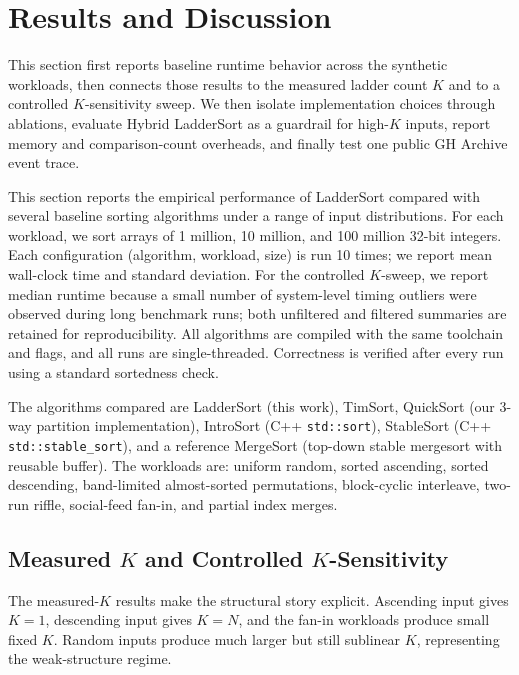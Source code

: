 \documentclass[10pt]{article}
\begin{document}
\section{\texorpdfstring{\textbf{Results and Discussion}}{Results and Discussion}}\label{results-and-discussion}

This section first reports baseline runtime behavior across the synthetic
workloads, then connects those results to the measured ladder count \(K\) and
to a controlled \(K\)-sensitivity sweep. We then isolate implementation choices
through ablations, evaluate Hybrid LadderSort as a guardrail for high-\(K\)
inputs, report memory and comparison-count overheads, and finally test one
public GH Archive event trace.

This section reports the empirical performance of LadderSort compared
with several baseline sorting algorithms under a range of input
distributions. For each workload, we sort arrays of 1 million, 10
million, and 100 million 32-bit integers. Each configuration (algorithm,
workload, size) is run 10 times; we report mean wall-clock time and
standard deviation. For the controlled \(K\)-sweep, we report median runtime because a small number of system-level timing outliers were observed during long benchmark runs; both unfiltered and filtered summaries are retained for reproducibility. All algorithms are compiled with the same toolchain
and flags, and all runs are single-threaded. Correctness is verified
after every run using a standard sortedness check.

The algorithms compared are LadderSort (this work), TimSort, QuickSort
(our 3-way partition implementation), IntroSort (C++ \texttt{std::sort}),
StableSort (C++ \texttt{std::stable\_sort}), and a reference MergeSort
(top-down stable mergesort with reusable buffer). The workloads are:
uniform random, sorted ascending, sorted descending, band-limited almost-sorted
permutations, block-cyclic interleave, two-run riffle, social-feed
fan-in, and partial index merges.

\subsection{Measured \(K\) and Controlled \(K\)-Sensitivity}
\label{measured-k-and-k-sensitivity}

The measured-\(K\) results make the structural story explicit. Ascending input gives \(K=1\), descending input gives \(K=N\), and the fan-in workloads produce small fixed \(K\). Random inputs produce much larger but still sublinear \(K\), representing the weak-structure regime.
\end{document}
